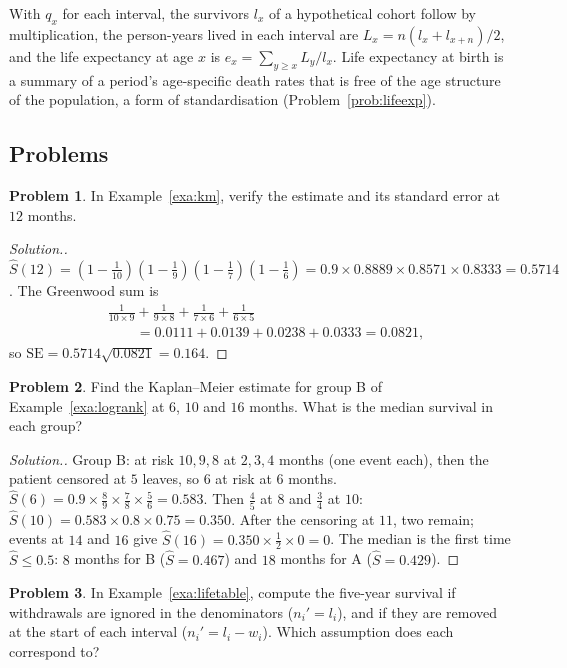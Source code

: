 \documentclass[11pt,a4paper]{article}
\numberwithin{equation}{section}
\theoremstyle{definition}
\newtheorem{problemx}{Problem}[subsection]
\newenvironment{problem}{\begin{problemx}}{\end{problemx}}
\newenvironment{solution}
  {\renewcommand{\qedsymbol}{}\begin{proof}[\textit{Solution}.]}
  {\end{proof}}
\begin{document}
With $q_x$ for each interval, the survivors $l_x$ of a hypothetical cohort follow by multiplication, the person-years lived in each interval are
$L_x = n(l_x + l_{x+n})/2$, and the life expectancy at age $x$ is $e_x = \sum_{y \geq x} L_y/l_x$. Life expectancy at birth is a summary of a period's age-specific
death rates that is free of the age structure of the population, a form of standardisation (Problem~\ref{prob:lifeexp}).

\subsection{Problems}

\begin{problem}
In Example~\ref{exa:km}, verify the estimate and its standard error at $12$ months.
\end{problem}

\begin{solution}
$\hat S(12) = (1 - \tfrac1{10})(1 - \tfrac19)(1 - \tfrac17)(1 - \tfrac16) = 0.9 \times 0.8889 \times 0.8571 \times 0.8333 = 0.5714$. The Greenwood sum is
\begin{align*}
&\frac{1}{10 \times 9} + \frac{1}{9 \times 8} + \frac{1}{7 \times 6} + \frac{1}{6 \times 5} \\
&\qquad = 0.0111 + 0.0139 + 0.0238 + 0.0333 = 0.0821 ,
\end{align*}
so $\text{SE} = 0.5714\sqrt{0.0821} = 0.164$.
\end{solution}

\begin{problem}
Find the Kaplan--Meier estimate for group B of Example~\ref{exa:logrank} at $6$, $10$ and $16$ months. What is the median survival in each
group?
\end{problem}

\begin{solution}
Group B: at risk $10, 9, 8$ at $2, 3, 4$ months (one event each), then the patient censored at $5$ leaves, so $6$ at risk at $6$ months. $\hat S(6) = 0.9 \times \tfrac89 \times \tfrac78 \times \tfrac56 = 0.583$.
Then $\tfrac45$ at $8$ and $\tfrac34$ at $10$: $\hat S(10) = 0.583 \times 0.8 \times 0.75 = 0.350$. After the censoring at $11$, two remain; events at $14$ and $16$ give
$\hat S(16) = 0.350 \times \tfrac12 \times 0 = 0$. The median is the first time $\hat S \leq 0.5$: $8$ months for B ($\hat S = 0.467$) and $18$ months for A ($\hat S = 0.429$).
\end{solution}

\begin{problem}
In Example~\ref{exa:lifetable}, compute the five-year survival if withdrawals are ignored in the denominators ($n_i' = l_i$), and if they are
removed at the start of each interval ($n_i' = l_i - w_i$). Which assumption does each correspond to?
\end{problem}
\end{document}
